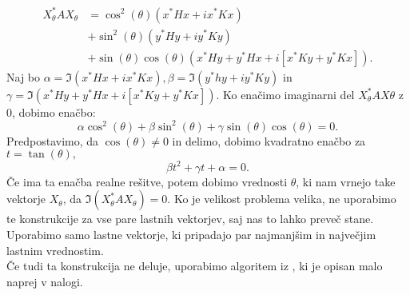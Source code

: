 \documentclass[12pt,a4paper]{amsart}
\theoremstyle{definition}
\theoremstyle{plain}
\begin{document}
\begin{align*}
X_\theta^\ast AX_\theta &= \cos^2(\theta)(x^\ast Hx + ix^\ast Kx)\\ 
&+ \sin^2(\theta)(y^\ast Hy + iy^\ast Ky)\\ 
&+\sin(\theta)\cos(\theta)(x^\ast Hy +y^\ast Hx +i[x^\ast Ky +y^\ast Kx]).
\end{align*}
Naj bo $\alpha=\Im(x^\ast Hx + ix^\ast Kx), \beta=\Im(y^\ast hy +iy^\ast Ky)$ in $\gamma=\Im(x^\ast Hy +y^\ast Hx +i[x^\ast Ky +y^\ast Kx]).$ Ko enačimo imaginarni del $X_\theta ^\ast AX\theta$ z 0, dobimo enačbo:
$$\alpha \cos^2(\theta) +\beta \sin^2(\theta) +\gamma \sin(\theta)\cos(\theta)=0.$$
Predpostavimo, da $\cos(\theta) \not =0$ in delimo, dobimo kvadratno enačbo za $t=\tan(\theta),$
$$\beta t^2 +\gamma t +\alpha =0.$$
Če ima ta enačba realne rešitve, potem dobimo vrednosti $\theta$, ki nam vrnejo take vektorje $X_\theta$, da $\Im(X_\theta ^\ast AX_\theta)=0$. Ko je velikost problema velika, ne uporabimo te konstrukcije za vse pare lastnih vektorjev, saj nas to lahko preveč stane. Uporabimo samo lastne vektorje, ki pripadajo par najmanjšim in največjim lastnim vrednostim.\\
Če tudi ta konstrukcija ne deluje, uporabimo algoritem iz \cite{trije}, ki je opisan malo naprej v nalogi.
\end{document}
